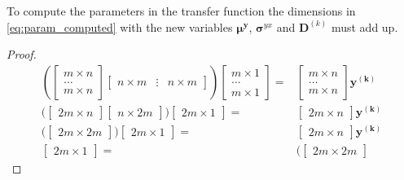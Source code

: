 To compute the parameters in the transfer function the dimensions in \eqref{eq:param_computed} with the new variables $\boldsymbol{\mu^y}$, $\boldsymbol{\sigma}^{yx}$ and $\mathbf{D}^{(k)}$ must add up.
\begin{proof}
\begin{equation*}
	\begin{split}
		\left(  
	\begin{bmatrix}
		m \times n \\
		\dots \\
		m \times n
	\end{bmatrix}
	\begin{bmatrix}
		n \times m & \vdots & n\times m
	\end{bmatrix} \right)
	\begin{bmatrix}
		m \times 1 \\
		\dots \\
		m \times 1 
	\end{bmatrix}
	= & 
	\begin{bmatrix}
		m \times n \\
		\dots \\
		m \times n
	\end{bmatrix} \mathbf{y^{(k)}}\\ %
	\biggl( \begin{bmatrix}
		2m \times n 
	\end{bmatrix}
	\begin{bmatrix}
		n \times 2m
	\end{bmatrix} \biggr) 
	\begin{bmatrix}
		2m \times 1
	\end{bmatrix}
	= & 
	\begin{bmatrix}
		2m \times n 
	\end{bmatrix} \mathbf{y^{(k)}} \\ %
	\biggl( \begin{bmatrix}
		2m \times  2m
	\end{bmatrix} \biggr) 
	\begin{bmatrix}
		2m \times 1 
	\end{bmatrix}
	= &
	\begin{bmatrix}
		2m \times n 
	\end{bmatrix} \mathbf{y^{(k)}} \\ %
	\begin{bmatrix}
		2m \times 1
	\end{bmatrix}
	= &
	\biggl(\begin{bmatrix}
		2m \times  2m

\end{bmatrix}
\end{split}
\end{equation*}
\end{proof}
